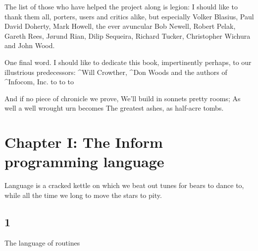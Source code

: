 The list of those who have helped the project along is legion: I should like
to thank them all, porters, users and critics alike, but especially Volker
Blasius, Paul David Doherty, Mark Howell, the ever avuncular Bob Newell, Robert
Pelak, Gareth Rees, J\o rund Rian, Dilip Sequeira, Richard Tucker,
Christopher Wichura and John Wood.

One final word.  I should like to dedicate this book, impertinently perhaps,
to our illustrious predecessors: ^{Will Crowther}, ^{Don Woods} and
the authors of ^{Infocom, Inc.}
\medskip
\hbox to
\hbox to
\hbox to
\bigskip\medskip

\poem
And if no piece of chronicle we prove,
We'll build in sonnets pretty rooms;
As well a well wrought urn becomes
The greatest ashes, as half-acre tombs.

\newpage

\chapter{Chapter I: The Inform programming language}

\vskip 0.5in
\quote
Language is a cracked kettle on which we beat out tunes
for bears to dance to, while all the time we long to move
the stars to pity.

\section{1}{The language of routines}

\def\asection#1#2{\bigbreak\noindent{\bf \S 1.#1\quad #2}\medskip\noindent}

